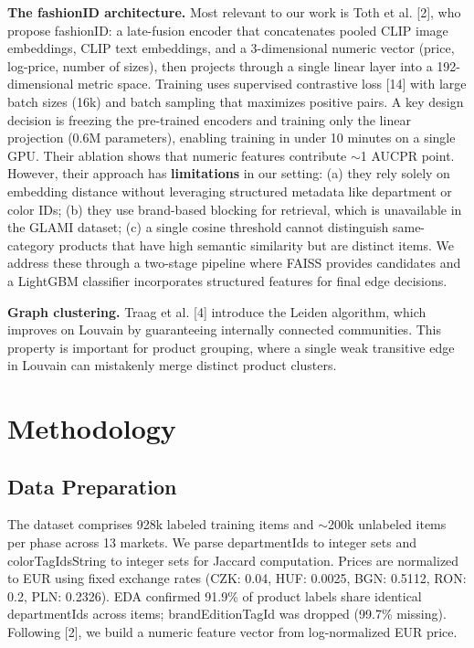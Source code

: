 \documentclass[10pt,twocolumn,a4paper]{article}
\begin{document}
\textbf{The fashionID architecture.} Most relevant to our work is Toth et al. [2], who propose fashionID: a 
late-fusion encoder that concatenates pooled CLIP image embeddings, CLIP text embeddings, and a 3-dimensional 
numeric vector (price, log-price, number of sizes), then projects through a single linear layer into a 192-dimensional
metric space. Training uses supervised contrastive loss [14] with large batch sizes (16k) and batch sampling that maximizes positive pairs. A key design decision is freezing the pre-trained encoders and training only the linear projection (0.6M parameters), enabling training in under 10 minutes on a single GPU. Their ablation shows that numeric features contribute $\sim$1 AUCPR point. However, their approach has \textbf{limitations} in our setting:
(a) they rely solely on embedding distance without leveraging structured metadata like department or color IDs;
(b) they use brand-based blocking for retrieval, which is unavailable in the GLAMI dataset;
(c) a single cosine threshold cannot distinguish same-category products that have high semantic similarity but are distinct items.
We address these through a two-stage pipeline where FAISS provides candidates and a LightGBM classifier incorporates 
structured features for final edge decisions.

\textbf{Graph clustering.} Traag et al. [4] introduce the Leiden algorithm, which improves on Louvain by guaranteeing 
internally connected communities. This property is important for product grouping, where a single weak transitive edge 
in Louvain can mistakenly merge distinct product clusters.

\section{Methodology}

\subsection{Data Preparation}
The dataset comprises 928k labeled training items and $\sim$200k unlabeled items per phase across 13 markets. 
We parse departmentIds to integer sets and colorTagIdsString to integer sets for Jaccard computation. Prices are 
normalized to EUR using fixed exchange rates (CZK: 0.04, HUF: 0.0025, BGN: 0.5112, RON: 0.2, PLN: 0.2326). 
EDA confirmed 91.9\% of product labels share identical departmentIds across items; brandEditionTagId was dropped 
(99.7\% missing). Following [2], we build a numeric feature vector from log-normalized EUR price.
\end{document}
